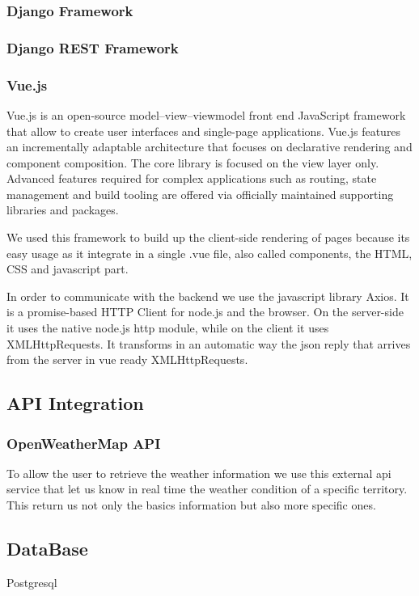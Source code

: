 \documentclass[table, 12pt]{article}
\begin{document}
\subsubsection{Django Framework}

\subsubsection{Django REST Framework}

\subsubsection{Vue.js}

Vue.js is an open-source model–view–viewmodel front end JavaScript framework that allow to create user interfaces and single-page applications.
Vue.js features an incrementally adaptable architecture that focuses on declarative rendering and component composition.
The core library is focused on the view layer only.
Advanced features required for complex applications such as routing, state management and build tooling are offered via officially maintained supporting libraries and packages.

We used this framework to build up the client-side rendering of pages because its easy usage as it integrate in a single .vue file, also called components,
the HTML, CSS and javascript part.

In order to communicate with the backend we use the javascript library Axios.
It is a promise-based HTTP Client for node.js and the browser.
On the server-side it uses the native node.js http module, while on the client it uses XMLHttpRequests.
It transforms in an automatic way the json reply that arrives from the server in vue ready XMLHttpRequests.

\subsection{API Integration}
\subsubsection{OpenWeatherMap API}
To allow the user to retrieve the weather information we use this external api service that let us know in real time
the weather condition of a specific territory.
This return us not only the basics information but also more specific ones.

\subsection{DataBase}
Postgresql
\end{document}
